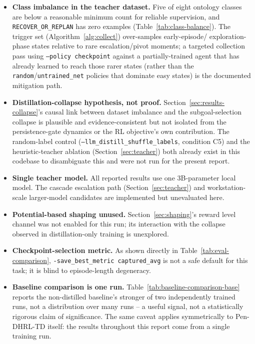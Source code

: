 \documentclass[11pt]{article}
\newcommand{\pendhrl}{Pen-DHRL-TD}
\newcommand{\code}[1]{\texttt{#1}}
\begin{document}
\begin{itemize}[leftmargin=1.4em]
  \item \textbf{Class imbalance in the teacher dataset.} Five of eight ontology
    classes are below a reasonable minimum count for reliable supervision, and
    \code{RECOVER\_OR\_REPLAN} has zero examples (Table~\ref{tab:class-balance}).
    The trigger set (Algorithm~\ref{alg:collect}) over-samples early-episode/
    exploration-phase states relative to rare escalation/pivot moments; a targeted
    collection pass using \code{--policy checkpoint} against a partially-trained
    agent that has already learned to reach those rarer states (rather than the
    \code{random}/\code{untrained\_net} policies that dominate easy states) is the
    documented mitigation path.
  \item \textbf{Distillation-collapse hypothesis, not proof.} Section~\ref{sec:results-collapse}'s
    causal link between dataset imbalance and the subgoal-selection collapse is
    plausible and evidence-consistent but not isolated from the persistence-gate
    dynamics or the RL objective's own contribution. The random-label control
    (\code{--llm\_distill\_shuffle\_labels}, condition C5) and the heuristic-teacher
    ablation (Section~\ref{sec:teacher}) both already exist in this codebase to
    disambiguate this and were not run for the present report.
  \item \textbf{Single teacher model.} All reported results use one 3B-parameter
    local model. The cascade escalation path (Section~\ref{sec:teacher}) and
    workstation-scale larger-model candidates are implemented but unevaluated here.
  \item \textbf{Potential-based shaping unused.} Section~\ref{sec:shaping}'s reward
    level channel was not enabled for this run; its interaction with the collapse
    observed in distillation-only training is unexplored.
  \item \textbf{Checkpoint-selection metric.} As shown directly in
    Table~\ref{tab:eval-comparison}, \code{-save\_best\_metric captured\_avg} is not
    a safe default for this task; it is blind to episode-length degeneracy.
  \item \textbf{Baseline comparison is one run.} Table~\ref{tab:baseline-comparison-base}
    reports the non-distilled baseline's stronger of two independently trained runs,
    not a distribution over many runs -- a useful signal, not a statistically
    rigorous claim of significance. The same caveat applies symmetrically to
    \pendhrl{} itself: the results throughout this report come from a single
    training run.
\end{itemize}
\end{document}
